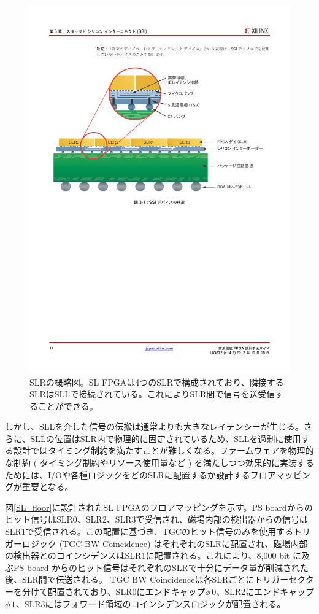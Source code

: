 \begin{figure} 
\centering
\includegraphics[width=16cm]{fig/Intro/ISEE_abstract.pdf}
\caption[SLRの概略図]{SLRの概略図。SL FPGAは4つのSLRで構成されており、隣接するSLRはSLLで接続されている。これによりSLR間で信号を送受信することができる。}
\label{ISEE_abstract}
\end{figure}

しかし、SLLを介した信号の伝搬は通常よりも大きなレイテンシーが生じる。さらに、SLLの位置はSLR内で物理的に固定されているため、SLLを過剰に使用する設計ではタイミング制約を満たすことが難しくなる。ファームウェアを物理的な制約 ( タイミング制約やリソース使用量など ) を満たしつつ効果的に実装するためには、I/Oや各種ロジックをどのSLRに配置するか設計するフロアマッピングが重要となる。

図\ref{SL_floor}に設計されたSL FPGAのフロアマッピングを示す。PS boardからのヒット信号はSLR0、SLR2、SLR3で受信され、磁場内部の検出器からの信号はSLR1で受信される。この配置に基づき、TGCのヒット信号のみを使用するトリガーロジック (TGC BW Coincidence) はそれぞれのSLRに配置され、磁場内部の検出器とのコインシデンスはSLR1に配置される。これにより、8,000 bit に及ぶPS board からのヒット信号はそれぞれのSLRで十分にデータ量が削減された後、SLR間で伝送される。
TGC BW Coincidenceは各SLRごとにトリガーセクターを分けて配置されており、SLR0にエンドキャップ$\phi\,0$、SLR2にエンドキャップ$\phi\,1$、SLR3にはフォワード領域のコインシデンスロジックが配置される。

